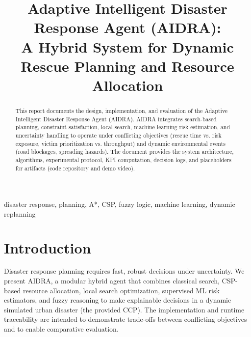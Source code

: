 \documentclass[conference]{IEEEtran}
\begin{document}
\title{Adaptive Intelligent Disaster Response Agent (AIDRA):\\
A Hybrid System for Dynamic Rescue Planning and Resource Allocation}

\author{
}

\maketitle

\begin{abstract}
This report documents the design, implementation, and evaluation of the
Adaptive Intelligent Disaster Response Agent (AIDRA). AIDRA integrates search-based
planning, constraint satisfaction, local search, machine learning risk estimation,
and uncertainty handling to operate under conflicting objectives (rescue time vs.
risk exposure, victim prioritization vs. throughput) and dynamic environmental events
(road blockages, spreading hazards). The document provides the system architecture,
algorithms, experimental protocol, KPI computation, decision logs, and placeholders
for artifacts (code repository and demo video).
\end{abstract}

\begin{IEEEkeywords}
disaster response, planning, A*, CSP, fuzzy logic, machine learning, dynamic replanning
\end{IEEEkeywords}

\section{Introduction}
Disaster response planning requires fast, robust decisions under uncertainty.
We present AIDRA, a modular hybrid agent that combines classical search, CSP-based
resource allocation, local search optimization, supervised ML risk estimators,
and fuzzy reasoning to make explainable decisions in a dynamic simulated urban
disaster (the provided CCP). The implementation and runtime traceability are
intended to demonstrate trade-offs between conflicting objectives and to enable
comparative evaluation.
\end{document}
